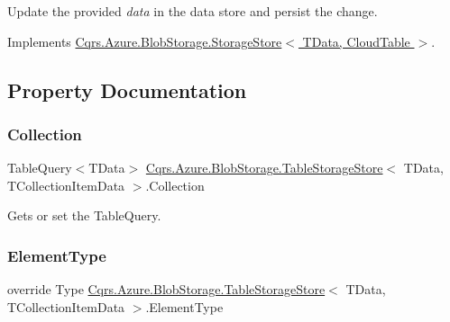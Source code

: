 Update the provided {\itshape data}  in the data store and persist the change. 



Implements \hyperlink{classCqrs_1_1Azure_1_1BlobStorage_1_1StorageStore_ae9ca8bfe30040f77e349a4d47b31da70_ae9ca8bfe30040f77e349a4d47b31da70}{Cqrs.\+Azure.\+Blob\+Storage.\+Storage\+Store$<$ T\+Data, Cloud\+Table $>$}.



\subsection{Property Documentation}
\mbox{\label{classCqrs_1_1Azure_1_1BlobStorage_1_1TableStorageStore_a97752ec9c5ad130a230924da9a75a537_a97752ec9c5ad130a230924da9a75a537}} 
\subsubsection{\texorpdfstring{Collection}{Collection}}
{\footnotesize\ttfamily Table\+Query$<$T\+Data$>$ \hyperlink{classCqrs_1_1Azure_1_1BlobStorage_1_1TableStorageStore}{Cqrs.\+Azure.\+Blob\+Storage.\+Table\+Storage\+Store}$<$ T\+Data, T\+Collection\+Item\+Data $>$.Collection\hspace{0.3cm}{\ttfamily [get]}}



Gets or set the Table\+Query. 

\mbox{\label{classCqrs_1_1Azure_1_1BlobStorage_1_1TableStorageStore_a57e68c383098e81303eeebe0b85c970c_a57e68c383098e81303eeebe0b85c970c}} 
\subsubsection{\texorpdfstring{Element\+Type}{ElementType}}
{\footnotesize\ttfamily override Type \hyperlink{classCqrs_1_1Azure_1_1BlobStorage_1_1TableStorageStore}{Cqrs.\+Azure.\+Blob\+Storage.\+Table\+Storage\+Store}$<$ T\+Data, T\+Collection\+Item\+Data $>$.Element\+Type\hspace{0.3cm}{\ttfamily [get]}}



